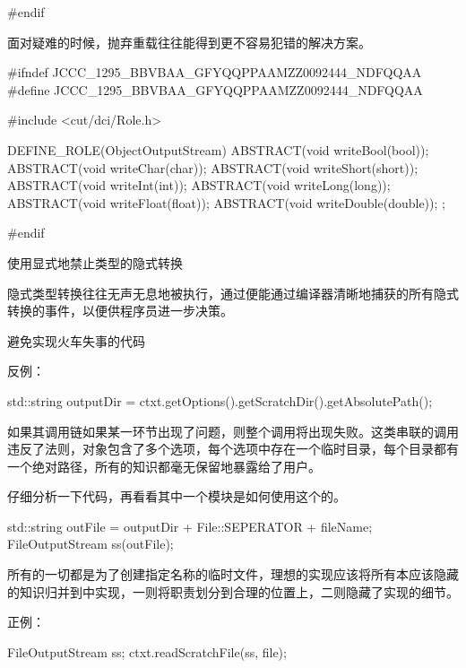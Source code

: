 \begin{content}
\begin{leftbar}
\begin{c++}[caption={io/ObjectOutputStream.h}]
#endif
\end{c++}
\end{leftbar}

面对疑难的时候，抛弃重载往往能得到更不容易犯错的解决方案。

\begin{leftbar}
\begin{c++}[caption={io/ObjectOutputStream.h}]
#ifndef JCCC_1295_BBVBAA_GFYQQPPAAMZZ0092444_NDFQQAA
#define JCCC_1295_BBVBAA_GFYQQPPAAMZZ0092444_NDFQQAA

#include <cut/dci/Role.h>

DEFINE_ROLE(ObjectOutputStream)
{
    ABSTRACT(void writeBool(bool));
    ABSTRACT(void writeChar(char));
    ABSTRACT(void writeShort(short));
    ABSTRACT(void writeInt(int));
    ABSTRACT(void writeLong(long));
    ABSTRACT(void writeFloat(float));
    ABSTRACT(void writeDouble(double));
};

#endif
\end{c++}
\end{leftbar}

\begin{regulation}
使用显式地禁止类型的隐式转换
\end{regulation}

隐式类型转换往往无声无息地被执行，通过便能通过编译器清晰地捕获的所有隐式转换的事件，以便供程序员进一步决策。

\begin{regulation}
避免实现火车失事的代码
\end{regulation}

反例：
\begin{leftbar}
\begin{c++}
std::string outputDir = ctxt.getOptions().getScratchDir().getAbsolutePath();
\end{c++}
\end{leftbar}

如果其调用链如果某一环节出现了问题，则整个调用将出现失败。这类串联的调用违反了法则，对象包含了多个选项，每个选项中存在一个临时目录，每个目录都有一个绝对路径，所有的知识都毫无保留地暴露给了用户。

仔细分析一下代码，再看看其中一个模块是如何使用这个的。

\begin{leftbar}
\begin{c++}
std::string outFile = outputDir + File::SEPERATOR + fileName;
FileOutputStream ss(outFile);
\end{c++}
\end{leftbar}

所有的一切都是为了创建指定名称的临时文件，理想的实现应该将所有本应该隐藏的知识归并到中实现，一则将职责划分到合理的位置上，二则隐藏了实现的细节。

正例：
\begin{leftbar}
\begin{c++}
FileOutputStream ss;
ctxt.readScratchFile(ss, file);
\end{c++}
\end{leftbar}

\end{content}

